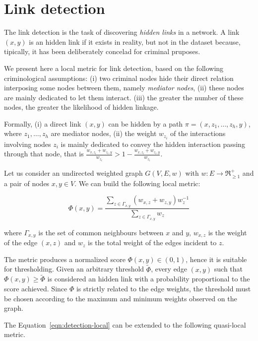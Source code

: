 \section{Link detection}
\label{sec:link-detection}

The link detection is the task of discovering \textit{hidden links} in a network. 
A link $(x,y)$ is an hidden link if it exists in reality, but not in the dataset because, tipically, it has been deliberately concelad for criminal pruposes.

We present here a local metric for link detection, based on the following criminological assumptions: 
(i) two criminal nodes hide their direct relation interposing some nodes between them, namely \textit{mediator nodes}, 
(ii) these nodes are mainly dedicated to let them interact.
(iii) the greater the number of these nodes, the greater the likelihood of hidden linkage. 

Formally, 
(i) a direct link $(x,y)$ can be hidden by a path $\pi=(x,z_{1},\ldots,z_{h},y)$, where $z_{1},\ldots,z_{h}$ are mediator nodes,
(ii) the weight $w_{z_{i}}$ of the interactions involving nodes $z_{i}$ is mainly dedicated to convey the hidden interaction passing through that node, that is $\frac{w_{x,z_{i}}+w_{z_{i},y}}{w_{z_{i}}} > 1- \frac{w_{x,z_{i}}+w_{z_{i},y}}{w_{z_{i}}}$.

Let us consider an undirected weighted graph $G(V,E,w)$ with $w:E\rightarrow\Re_{\geq1}^{+}$ and a pair of nodes $x,y\in V$.
We can build the following local metric:


\begin{equation}
\label{eqn:detection-local}
\Phi(x,y)=
\frac{\sum\limits_{z\in\Gamma_{x,y}}(w_{x,z}+w_{z,y})w_{z}^{-1}}
{\sum\limits_{z\in\Gamma_{x,y}}w_{z}}
\end{equation}

where 
$\Gamma_{x,y}$ is the set of common neighbours between $x$ and $y$,
$w_{x,z}$ is the weight of the edge $(x,z)$ and
$w_{z}$ is the total weight of the edges incident to $z$.

The metric produces a normalized score $\Phi(x,y)\in(0,1)$, hence it is suitable for thresholding.
Given an arbitrary threshold $\tilde{\Phi}$, every edge $(x,y)$ such that $\Phi(x,y)\geq\tilde{\Phi}$ is considered an hidden link with a probability proportional to the score achieved.
Since $\Phi$ is strictly related to the edge weights, the threshold must be chosen according to the maximum and minimum weights observed on the graph.

The Equation~\ref{eqn:detection-local} can be extended to the following quasi-local metric.

